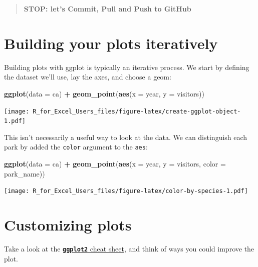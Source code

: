 \documentclass[]{book}
\newenvironment{Shaded}{\begin{snugshade}}{\end{snugshade}}
\newcommand{\DataTypeTok}[1]{\textcolor[rgb]{0.13,0.29,0.53}{#1}}
\newcommand{\KeywordTok}[1]{\textcolor[rgb]{0.13,0.29,0.53}{\textbf{#1}}}
\newcommand{\NormalTok}[1]{#1}
\newcommand{\OperatorTok}[1]{\textcolor[rgb]{0.81,0.36,0.00}{\textbf{#1}}}
\newcommand{\StringTok}[1]{\textcolor[rgb]{0.31,0.60,0.02}{#1}}
\begin{document}
\begin{quote}
\textbf{STOP: let's Commit, Pull and Push to GitHub}
\end{quote}

\hypertarget{building-your-plots-iteratively}{%
\section{Building your plots iteratively}\label{building-your-plots-iteratively}}

Building plots with ggplot is typically an iterative process. We start by defining the dataset we'll use, lay the axes, and choose a geom:

\begin{Shaded}
\begin{Highlighting}[]
\KeywordTok{ggplot}\NormalTok{(}\DataTypeTok{data =}\NormalTok{ ca) }\OperatorTok{+}
\StringTok{    }\KeywordTok{geom_point}\NormalTok{(}\KeywordTok{aes}\NormalTok{(}\DataTypeTok{x =}\NormalTok{ year, }\DataTypeTok{y =}\NormalTok{ visitors))}
\end{Highlighting}
\end{Shaded}

\texttt{[image: R\_for\_Excel\_Users\_files/figure-latex/create-ggplot-object-1.pdf]}

This isn't necessarily a useful way to look at the data. We can distinguish each park by added the \texttt{color} argument to the \texttt{aes}:

\begin{Shaded}
\begin{Highlighting}[]
\KeywordTok{ggplot}\NormalTok{(}\DataTypeTok{data =}\NormalTok{ ca) }\OperatorTok{+}
\StringTok{    }\KeywordTok{geom_point}\NormalTok{(}\KeywordTok{aes}\NormalTok{(}\DataTypeTok{x =}\NormalTok{ year, }\DataTypeTok{y =}\NormalTok{ visitors, }\DataTypeTok{color =}\NormalTok{ park_name))}
\end{Highlighting}
\end{Shaded}

\texttt{[image: R\_for\_Excel\_Users\_files/figure-latex/color-by-species-1.pdf]}

\hypertarget{customizing-plots}{%
\section{Customizing plots}\label{customizing-plots}}

Take a look at the \href{https://www.rstudio.com/wp-content/uploads/2016/11/ggplot2-cheatsheet-2.1.pdf}{\textbf{\texttt{ggplot2}} cheat sheet}, and think of ways you could improve the plot.
\end{document}
